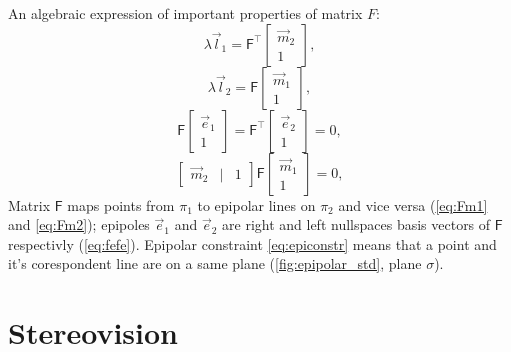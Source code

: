 An algebraic expression of important properties of matrix $F$:
\begin{equation}
    \label{eq:Fm2}
    \lambda \vec{l}_1 = \pmb{\mathsf{F}}^\top \begin{bmatrix} \vec{m}_2 \\ 1 \end{bmatrix},
\end{equation}
\begin{equation}
    \label{eq:Fm1}
    \lambda \vec{l}_2 = \pmb{\mathsf{F}} \begin{bmatrix} \vec{m}_1 \\ 1 \end{bmatrix},
\end{equation}
\begin{equation}
    \label{eq:fefe}
    \pmb{\mathsf{F}} \begin{bmatrix} \vec{e}_1 \\ 1 \end{bmatrix} = \pmb{\mathsf{F}}^\top \begin{bmatrix} \vec{e}_2 \\ 1 \end{bmatrix} = 0,
\end{equation}
\begin{equation}
    \label{eq:epiconstr}
    \begin{bmatrix} \vec{m}_2 & | & 1 \end{bmatrix} \pmb{\mathsf{F}} \begin{bmatrix} \vec{m}_1 \\ 1 \end{bmatrix} = 0,
\end{equation}
Matrix $\pmb{\mathsf{F}}$ maps points from $\pi_1$ to epipolar lines on $\pi_2$ and vice versa (\autoref{eq:Fm1} and \autoref{eq:Fm2}); epipoles $\vec{e}_1$ and $\vec{e}_2$ are right and left nullspaces basis vectors of $\pmb{\mathsf{F}}$ respectivly (\autoref{eq:fefe}).
Epipolar constraint \autoref{eq:epiconstr} means that a point and it's corespondent line are on a same plane (\autoref{fig:epipolar_std}, plane $\sigma$).

\section{Stereovision}

